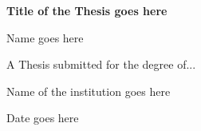\begin{titlepage}
  \centering
  \vspace*{1in}
  \begin{Large}\bfseries
    Title of the Thesis goes here\par
  \end{Large}
  \vspace{1in}
  \begin{large}
    Name goes here\par
  \end{large}
  \vfill
  A Thesis submitted for the degree of...\par
  \vspace{0.5in}
  Name of the institution goes here\par
  \vspace{0.5in}
  Date goes here\par
\end{titlepage}

